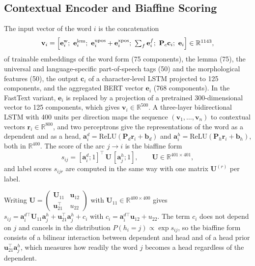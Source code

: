 \documentclass[mathematics,article,submit,pdftex,oneauthor]{Definitions/mdpi}
\newcommand{\R}{\mathbb R}
\begin{document}


\subsection{Contextual Encoder and Biaffine Scoring}
The input vector of the word $i$ is the concatenation
\begin{equation}\label{eq:input}
\mathbf v_i=\Bigl[\mathbf e^{\mathrm w}_i;\ \mathbf e^{\mathrm{lem}}_i;\ \mathbf e^{\mathrm{upos}}_i+\mathbf e^{\mathrm{xpos}}_i;\ \textstyle\sum_{f}\mathbf e^{f}_i;\ \mathbf P_c\mathbf c_i;\ \mathbf e_i\Bigr]\in\R^{1143},
\end{equation}
of trainable embeddings of the word form (75 components), the lemma (75), the universal and language-specific part-of-speech tags (50) and the morphological features (50), the output $\mathbf c_i$ of a character-level LSTM projected to 125 components, and the aggregated BERT vector $\mathbf e_i$ (768 components).
In the FastText variant, $\mathbf e_i$ is replaced by a projection of a pretrained 300-dimensional vector to 125 components, which gives $\mathbf v_i\in\R^{500}$.
A three-layer bidirectional LSTM with 400 units per direction maps the sequence $(\mathbf v_1,\dots,\mathbf v_n)$ to contextual vectors $\mathbf r_i\in\R^{800}$, and two perceptrons give the representations of the word as a dependent and as a head, $\mathbf a^{d}_i=\mathrm{ReLU}(\mathbf P_d\mathbf r_i+\mathbf b_d)$ and $\mathbf a^{h}_i=\mathrm{ReLU}(\mathbf P_h\mathbf r_i+\mathbf b_h)$, both in $\R^{400}$.
The score of the arc $j\to i$ is the biaffine form
\begin{equation}\label{eq:biaffine}
s_{ij}=[\mathbf a^{d}_i;1]^{\top}\,\mathbf U\,[\mathbf a^{h}_j;1],\qquad \mathbf U\in\R^{401{\times}401},
\end{equation}
and label scores $s_{ijr}$ are computed in the same way with one matrix $\mathbf U^{(r)}$ per label.

\begin{Remark}\label{rem:biaffine}
Writing $\mathbf U=\begin{pmatrix}\mathbf U_{11}&\mathbf u_{12}\\ \mathbf u_{21}^{\top}&u_{22}\end{pmatrix}$ with $\mathbf U_{11}\in\R^{400\times400}$ gives $s_{ij}=\mathbf a^{d\top}_i\mathbf U_{11}\mathbf a^{h}_j+\mathbf u_{21}^{\top}\mathbf a^{h}_j+c_i$ with $c_i=\mathbf a^{d\top}_i\mathbf u_{12}+u_{22}$.
The term $c_i$ does not depend on $j$ and cancels in the distribution $P(h_i=j)\propto\exp s_{ij}$, so the biaffine form consists of a bilinear interaction between dependent and head and of a head prior $\mathbf u_{21}^{\top}\mathbf a^{h}_j$, which measures how readily the word $j$ becomes a head regardless of the dependent.
\end{Remark}
\end{document}
